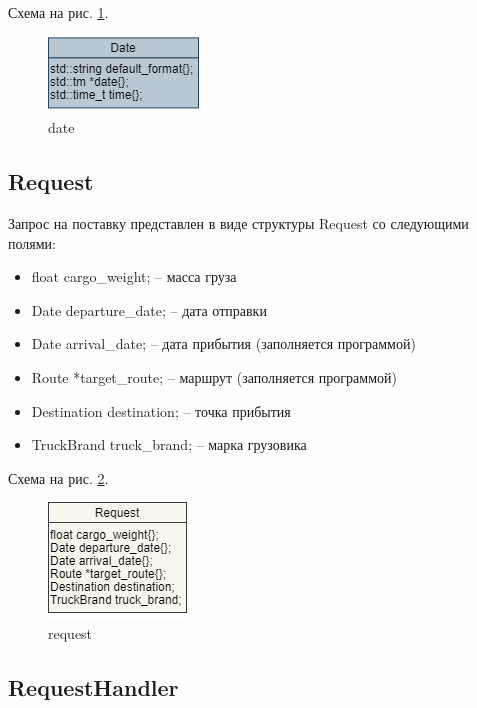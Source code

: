 Схема на рис. \ref{date}.

\begin{figure}[hpt!]
    \centering
    \includegraphics[width=0.4\linewidth]{photo/date}
    \caption{date}
    \label{date}
\end{figure}

\subsection{Request}

Запрос на поставку представлен в виде структуры Request со следующими полями: 

\begin{itemize}
    \item float cargo\_weight{}; -- масса груза
    \item Date departure\_date{}; -- дата отправки
    \item Date arrival\_date{}; -- дата прибытия (заполняется программой)
    \item Route *target\_route{}; -- маршрут (заполняется программой)
    \item Destination destination; -- точка прибытия
    \item TruckBrand truck\_brand; -- марка грузовика
\end{itemize}

Схема на рис. \ref{request}.

\begin{figure}[hpt!]
    \centering
    \includegraphics[width=0.4\linewidth]{photo/request}
    \caption{request}
    \label{request}
\end{figure}

\subsection{RequestHandler}

